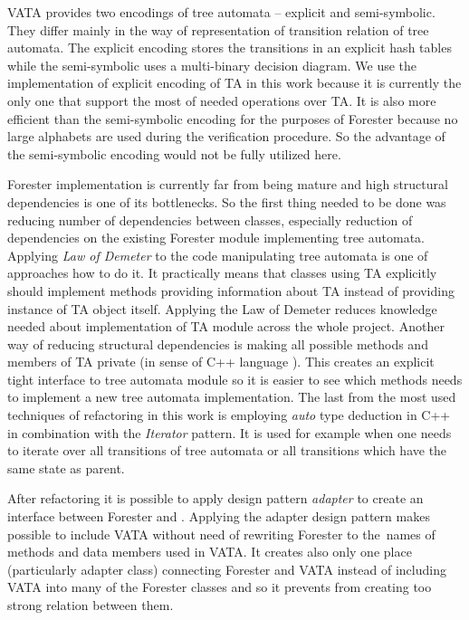 \documentclass[fleqn,11pt]{ExcelAtFIT} %
\begin{document}
VATA provides two encodings of tree automata -- explicit and semi-symbolic.
They differ mainly in the way of representation of transition relation of tree automata.
The explicit encoding stores the transitions in an explicit hash tables while the semi-symbolic
uses a multi-binary decision diagram.
We use the implementation of explicit encoding of TA in this work because
it is currently the only one that support the most of needed operations over TA.
It is also more efficient than the semi-symbolic encoding for the purposes of Forester because no large alphabets are used during the verification procedure.
So the advantage of the semi-symbolic encoding would not be fully utilized here.

Forester implementation is currently far from being mature and
high structural dependencies is one of its bottlenecks.
So the first thing needed to be done was reducing number of dependencies between classes,
especially reduction of dependencies on the existing Forester module implementing tree automata.
Applying \emph{Law of Demeter} \cite{lod89} to the code manipulating tree automata is one of approaches how to do it. 
It practically means that classes using TA explicitly should implement methods providing information about TA instead of providing instance of TA object itself.
Applying the Law of Demeter reduces knowledge needed about implementation of TA module across the whole project.
Another way of reducing structural dependencies is making all possible methods and members of TA private (in sense of C++ language \cite{stroustrup13}).
This creates an explicit tight interface to tree automata module so it is easier to see which methods needs to implement
a new tree automata implementation.
The last from the most used techniques of refactoring in this work is employing \emph{auto} type deduction in C++ in combination
with the \emph{Iterator} pattern.
It is used for example when one needs to iterate over all transitions of tree automata or all transitions which
have the same state as parent.

After refactoring it is possible to apply design pattern \emph{adapter} \cite{gamma95} to create
an interface between Forester and \vata.
Applying the adapter design pattern makes possible to include VATA without need of rewriting
Forester to the~names of methods and data members used in VATA.
It creates also only one place (particularly adapter class) connecting Forester and VATA instead of
including VATA into many of the Forester classes and so it prevents from creating too strong relation between them.
\end{document}
